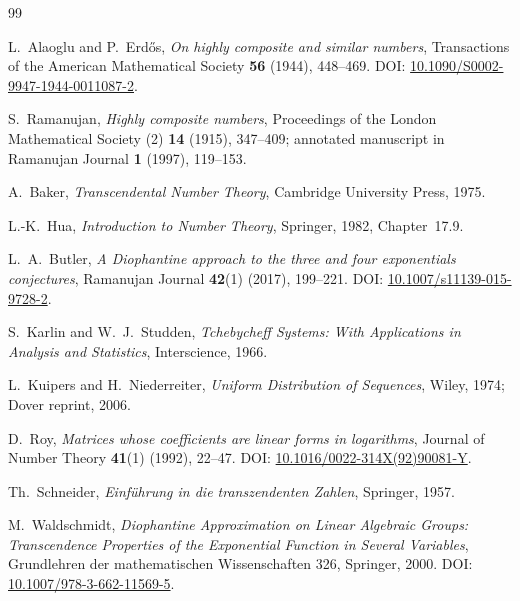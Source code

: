 \documentclass[11pt,oneside]{article}
\theoremstyle{definition}
\theoremstyle{remark}
\begin{document}
\begin{thebibliography}{99}

L.~Alaoglu and P.~Erd\H{o}s,
\newblock \emph{On highly composite and similar numbers},
\newblock Transactions of the American Mathematical Society \textbf{56} (1944), 448--469.
\newblock DOI:
\href{https://doi.org/10.1090/S0002-9947-1944-0011087-2}{10.1090/S0002-9947-1944-0011087-2}.

S.~Ramanujan,
\newblock \emph{Highly composite numbers},
\newblock Proceedings of the London Mathematical Society (2) \textbf{14} (1915), 347--409;
annotated manuscript in Ramanujan Journal \textbf{1} (1997), 119--153.

A.~Baker,
\newblock \emph{Transcendental Number Theory},
\newblock Cambridge University Press, 1975.

L.-K.~Hua,
\newblock \emph{Introduction to Number Theory},
\newblock Springer, 1982, Chapter~17.9.

L.~A.~Butler,
\newblock \emph{A Diophantine approach to the three and four exponentials conjectures},
\newblock Ramanujan Journal \textbf{42}(1) (2017), 199--221.
\newblock DOI: \href{https://doi.org/10.1007/s11139-015-9728-2}{10.1007/s11139-015-9728-2}.

S.~Karlin and W.~J.~Studden,
\newblock \emph{Tchebycheff Systems: With Applications in Analysis and Statistics},
\newblock Interscience, 1966.

L.~Kuipers and H.~Niederreiter,
\newblock \emph{Uniform Distribution of Sequences},
\newblock Wiley, 1974; Dover reprint, 2006.

D.~Roy,
\newblock \emph{Matrices whose coefficients are linear forms in logarithms},
\newblock Journal of Number Theory \textbf{41}(1) (1992), 22--47.
\newblock DOI:
\href{https://doi.org/10.1016/0022-314X(92)90081-Y}{10.1016/0022-314X(92)90081-Y}.

Th.~Schneider,
\newblock \emph{Einf\"uhrung in die transzendenten Zahlen},
\newblock Springer, 1957.

M.~Waldschmidt,
\newblock \emph{Diophantine Approximation on Linear Algebraic Groups: Transcendence
Properties of the Exponential Function in Several Variables},
\newblock Grundlehren der mathematischen Wissenschaften 326, Springer, 2000.
\newblock DOI: \href{https://doi.org/10.1007/978-3-662-11569-5}{10.1007/978-3-662-11569-5}.


\end{thebibliography}
\end{document}
